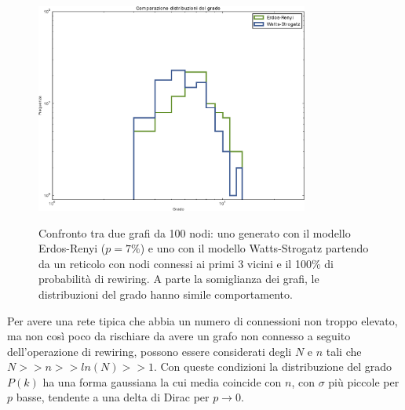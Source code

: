 \begin{figure}[t!]
	\centering
	$\;$
	\\
	\subfloat
	{\includegraphics[width=0.8\textwidth]{./Immagini/Teoria/ComparGradeModel}}
	\caption[Confronto grafi random.]{Confronto tra due grafi da 100 nodi: uno generato con il modello Erdos-Renyi ($p=7\%$) e uno con il modello Watts-Strogatz partendo da un reticolo con nodi connessi ai primi 3 vicini e il 100\% di probabilit\`a di rewiring. A parte la somiglianza dei grafi, le distribuzioni del grado hanno simile comportamento.}
	\label{fig:confrontorandom}
\end{figure}

Per avere una rete tipica che abbia un numero di connessioni non troppo elevato, ma non così poco da rischiare da avere un grafo non connesso a seguito dell'operazione di rewiring, possono essere considerati degli $N$ e $n$ tali che $N>>n>>ln(N)>>1$. Con queste condizioni la distribuzione del grado $P(k)$ ha una forma gaussiana la cui media coincide con $n$, con $\sigma$ più piccole per $p$ basse, tendente a una delta di Dirac per $p \rightarrow 0$. 

